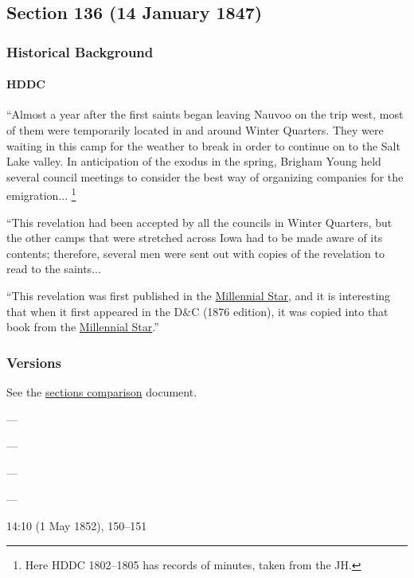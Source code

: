 \subsection{Section 136 (14 January 1847)}
	\label{DC136}
	
	\subsubsection{Historical Background}
		\label{DC136-HB}
		
		\paragraph{HDDC}
		
			``Almost a year after the first saints began leaving Nauvoo on the trip west, most of them were temporarily located in and around Winter Quarters. They were waiting in this camp for the weather to break in order to continue on to the Salt Lake valley. In anticipation of the exodus in the spring, Brigham Young held several council meetings to consider the best way of organizing companies for the emigration...%
				\footnote{%
					Here HDDC 1802--1805 has records of minutes, taken from the JH.
					}
					
			``This revelation had been accepted by all the councils in Winter Quarters, but the other camps that were stretched across Iowa had to be made aware of its contents; therefore, several men were sent out with copies of the revelation to read to the saints...
			
			``This revelation was first published in the \uline{Millennial Star}, and it is interesting that when it first appeared in the D\&C (1876 edition), it was copied into that book from the \uline{Millennial Star}.''

	\subsubsection{Versions}
		\label{DC136-V}
		
		See the \href{https://drive.google.com/file/d/1goAvNz8jS4R8slYfMG_db55Ty2z_vmgK/view?usp=sharing}{sections comparison} document.
	
		\begin{compactdesc}
			\item[JSP] ---
			\item[BC] ---
			\item[DC 1835] ---
			\item[DC 1844] ---
			\item[MS] 14:10 (1 May 1852), 150--151
		\end{compactdesc}

